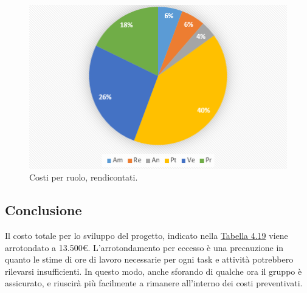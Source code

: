 \documentclass[a4paper]{report}
\begin{document}
				\begin{figure}[H]
					\centering
					\includegraphics[scale=0.7]{PCCostiRendicontati}
					\caption{Costi per ruolo, rendicontati.}
				\end{figure}
			\subsection{Conclusione}
				Il costo totale per lo sviluppo del progetto, indicato nella \hyperref[TCRendicontati]{Tabella 4.19} viene 
				arrotondato a 13.500\euro. L'arrotondamento per eccesso è una precauzione in quanto le stime di ore di lavoro 
				necessarie per ogni task e attività potrebbero rilevarsi insufficienti. In questo modo, anche sforando di qualche 
				ora il gruppo è assicurato, e riuscirà più facilmente a rimanere all'interno dei costi preventivati.
				
\end{document}
